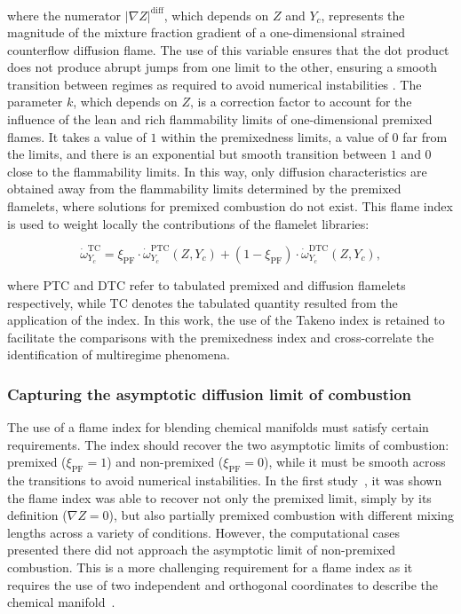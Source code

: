\documentclass[preprint,12pt,authoryear]{elsarticle}
\begin{document}
where the numerator $|\nabla Z|^\mathrm{diff}$, which depends on $Z$ and $Y_c$, represents the magnitude of the mixture fraction gradient of a one-dimensional strained counterflow diffusion flame. The use of this variable ensures that the dot product does not produce abrupt jumps from one limit to the other, ensuring a smooth transition between regimes as required to avoid numerical instabilities \citep{kleinheinz_computational_2017}. The parameter $k$, which depends on $Z$, is a correction factor to account for the influence of the lean and rich flammability limits of one-dimensional premixed flames. It takes a value of $1$ within the premixedness limits, a value of $0$ far from the limits, and there is an exponential but smooth transition between $1$ and $0$ close to the flammability limits. In this way, only diffusion characteristics are obtained away from the flammability limits determined by the premixed flamelets, where solutions for premixed combustion do not exist. This flame index is used to weight locally the contributions of the flamelet libraries:

\begin{equation}
    \dot{\omega}_{Y_c}^\mathrm{TC} = \xi_\mathrm{PF} \cdot\dot{\omega}_{Y_c}^\mathrm{PTC}  \left( Z, Y_c \right) + \left( 1 - \xi_\mathrm{PF} \right) \cdot \dot{\omega}_{Y_c}^\mathrm{DTC} \left( Z, Y_c \right),
\end{equation}


where PTC and DTC refer to tabulated premixed and diffusion flamelets respectively, while TC denotes the tabulated quantity resulted from the application of the index. In this work, the use of the Takeno index is retained to facilitate the comparisons with the premixedness index and cross-correlate the identification of multiregime phenomena.


\subsubsection*{Capturing the asymptotic diffusion limit of combustion}

The use of a flame index for blending chemical manifolds must satisfy certain requirements. The index should
recover the two asymptotic limits of combustion: premixed ($\xi_\mathrm{PF} = 1$) and non-premixed ($\xi_\mathrm{PF} = 0$), 
while it must be smooth across the transitions to avoid numerical instabilities. In the first study~\citep{illana_extended_2021}, it was shown the flame index was able to recover not only the premixed limit, simply by its definition ($\nabla Z = 0$), but also partially premixed combustion with different mixing lengths across a variety of conditions. However, the computational cases presented there did not approach the asymptotic limit of non-premixed combustion. This is a more challenging requirement for a flame index as it requires the use of two independent and orthogonal coordinates to describe the chemical manifold~\citep{mueller_physically-derived_2020,scholtissek_derivation_2020}. 
\end{document}
